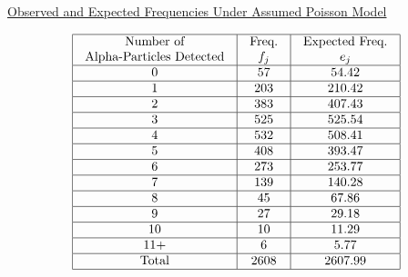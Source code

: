 \underline{Observed and Expected Frequencies Under Assumed Poisson Model}

\[ \begin{array}{|c|c|c|}
        \hline \begin{array}{c}
            \text{Number of} \\
            \text{Alpha-Particles Detected}
        \end{array} & \begin{array}{c}
            \text{Freq.} \\
            f_{j}
        \end{array} & \begin{array}{c}
            \text{Expected Freq.} \\
            e_{j}
        \end{array} \\
        \hline 0                          & 57                         & 54.42                      \\
        \hline 1                          & 203                        & 210.42                     \\
        \hline 2                          & 383                        & 407.43                     \\
        \hline 3                          & 525                        & 525.54                     \\
        \hline 4                          & 532                        & 508.41                     \\
        \hline 5                          & 408                        & 393.47                     \\
        \hline 6                          & 273                        & 253.77                     \\
        \hline 7                          & 139                        & 140.28                     \\
        \hline 8                          & 45                         & 67.86                      \\
        \hline 9                          & 27                         & 29.18                      \\
        \hline 10                         & 10                         & 11.29                      \\
        \hline 11+                        & 6                          & 5.77                       \\
        \hline \text{Total}               & 2608                       & 2607.99                    \\
        \hline
    \end{array} \]


